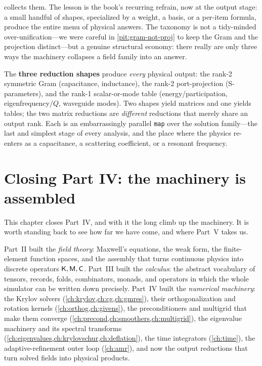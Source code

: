  collects them. The lesson is the book's recurring refrain,
now at the output stage: a small handful of shapes, specialized by a weight, a
basis, or a per-item formula, produce the entire menu of physical answers. The
taxonomy is not a tidy-minded over-unification---we were careful in
\cref{pit:gram-not-proj} to keep the Gram and the projection distinct---but a
genuine structural economy: there really are only three ways the machinery
collapses a field family into an answer.

\begin{keyidea}
The \textbf{three reduction shapes} produce \emph{every} physical output:
the rank-2 symmetric Gram (capacitance, inductance), the rank-2 port-projection
(S-parameters), and the rank-1 scalar-or-mode table (energy/participation,
eigenfrequency/$Q$, waveguide modes). Two shapes yield matrices and one yields
tables; the two matrix reductions are \emph{different} reductions that merely
share an output rank. Each is an embarrassingly parallel \texttt{map} over the
solution family---the last and simplest stage of every analysis, and the place
where the physics re-enters as a capacitance, a scattering coefficient, or a
resonant frequency.
\end{keyidea}

\section{Closing Part IV: the machinery is assembled}
\label{sec:bridge}

This chapter closes Part~IV, and with it the long climb up the machinery. It is
worth standing back to see how far we have come, and where Part~V takes us.

Part~II built the \emph{field theory}: Maxwell's equations, the weak form, the
finite-element function spaces, and the assembly that turns continuous physics
into discrete operators $\mathsf{K},\mathsf{M},\mathsf{C}$. Part~III built the \emph{calculus}: the
abstract vocabulary of tensors, records, folds, combinators, monads, and
operators in which the whole simulator can be written down precisely. Part~IV
built the \emph{numerical machinery}: the Krylov solvers (\cref{ch:krylov,ch:cg,ch:gmres}),
their orthogonalization and rotation kernels (\cref{ch:orthog,ch:givens}), the
preconditioners and multigrid that make them converge (\cref{ch:precond,ch:smoothers,ch:multigrid}),
the eigenvalue machinery and its spectral transforms (\cref{ch:eigenvalues,ch:krylovschur,ch:deflation}),
the time integrators (\cref{ch:time}), the adaptive-refinement outer loop
(\cref{ch:amr}), and now the output reductions that turn solved fields into
physical products.

